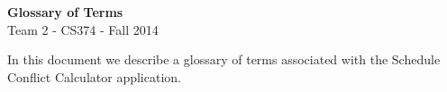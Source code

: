 \documentclass[11pt]{article}
\begin{document}
\begin{center}
\LARGE \textbf{Glossary of Terms} \\
\normalsize Team 2 - CS374 - Fall 2014
\end{center}
\vspace{.1in}

In this document we describe a glossary of terms associated with the Schedule Conflict Calculator application.


\end{document}
